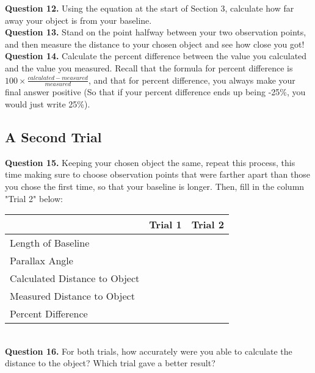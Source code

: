 \documentclass[11pt]{article}
\begin{document}
\textbf{Question 12.} Using the equation at the start of Section 3, calculate how far away your object is from your baseline.\\

\textbf{Question 13.} Stand on the point halfway between your two observation points, and then measure the distance to your chosen object and see how close you got!\\

\textbf{Question 14.} Calculate the percent difference between the value you calculated and the value you measured. Recall that the formula for percent difference is $100\times\frac{calculated-measured}{measured}$, and that for percent difference, you always make your final answer positive (So that if your percent difference ends up being -25\%, you would just write 25\%).

\newpage

\subsection*{A Second Trial}

\textbf{Question 15.} Keeping your chosen object the same, repeat this process, this time making sure to choose observation points that were farther apart than those you chose the first time, so that your baseline is longer. Then, fill in the column "Trial 2" below: \\

\begin{tabular}{| l | c | c |}
	\hline
	                               & Trial 1\hspace{4cm} & Trial 2\hspace{4cm}  \\ \hline
	Length of Baseline  &                     &                      \\ \hline
	Parallax Angle &                     &                      \\ \hline
	Calculated Distance to Object        &                     &                      \\ \hline
	Measured Distance to Object          &                     &                      \\ \hline
	Percent Difference                   &                     &                      \\
	\hline
\end{tabular}\\

\textbf{Question 16.} For both trials, how accurately were you able to calculate the distance to the object? Which trial gave a better result?\\
\end{document}
